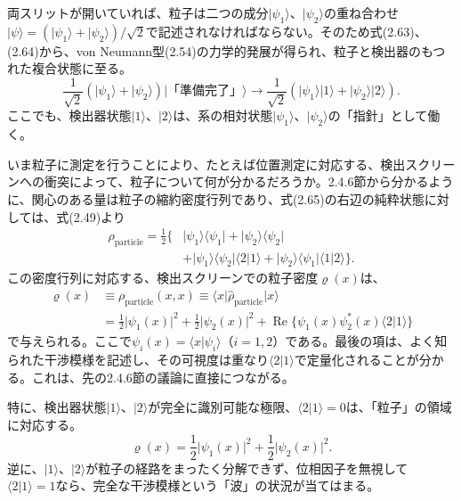 両スリットが開いていれば、粒子は二つの成分$\lvert\psi_1\rangle$、$\lvert\psi_2\rangle$の重ね合わせ$\lvert\psi\rangle=(\lvert\psi_1\rangle+\lvert\psi_2\rangle)/\sqrt2$で記述されなければならない。そのため式(2.63)、(2.64)から、von Neumann型(2.54)の力学的発展が得られ、粒子と検出器のもつれた複合状態に至る。
\begin{equation}\frac1{\sqrt2}(\lvert\psi_1\rangle+\lvert\psi_2\rangle)\lvert\text{「準備完了」}\rangle\longrightarrow\frac1{\sqrt2}(\lvert\psi_1\rangle\lvert1\rangle+\lvert\psi_2\rangle\lvert2\rangle).\tag{2.65}\end{equation}
ここでも、検出器状態$\lvert1\rangle$、$\lvert2\rangle$は、系の相対状態$\lvert\psi_1\rangle$、$\lvert\psi_2\rangle$の「指針」として働く。

いま粒子に測定を行うことにより、たとえば位置測定に対応する、検出スクリーンへの衝突によって、粒子について何が分かるだろうか。2.4.6節から分かるように、関心のある量は粒子の縮約密度行列であり、式(2.65)の右辺の純粋状態に対しては、式(2.49)より
\begin{equation}\begin{split}\hat\rho_{\mathrm{particle}}=\frac12\{&\lvert\psi_1\rangle\langle\psi_1\rvert+\lvert\psi_2\rangle\langle\psi_2\rvert\\&+\lvert\psi_1\rangle\langle\psi_2\rvert\langle2\vert1\rangle+\lvert\psi_2\rangle\langle\psi_1\rvert\langle1\vert2\rangle\}.\end{split}\tag{2.66}\end{equation}
この密度行列に対応する、検出スクリーンでの粒子密度$\varrho(x)$は、
\begin{equation}\begin{split}\varrho(x)&\equiv\rho_{\mathrm{particle}}(x,x)\equiv\langle x\rvert\hat\rho_{\mathrm{particle}}\lvert x\rangle\\&=\frac12\lvert\psi_1(x)\rvert^2+\frac12\lvert\psi_2(x)\rvert^2+\operatorname{Re}\{\psi_1(x)\psi_2^*(x)\langle2\vert1\rangle\}\end{split}\tag{2.67}\end{equation}
で与えられる。ここで$\psi_i(x)=\langle x\vert\psi_i\rangle$（$i=1,2$）である。最後の項は、よく知られた干渉模様を記述し、その可視度は重なり$\langle2\vert1\rangle$で定量化されることが分かる。これは、先の2.4.6節の議論に直接につながる。

特に、検出器状態$\lvert1\rangle$、$\lvert2\rangle$が完全に識別可能な極限、$\langle2\vert1\rangle=0$は、「粒子」の領域に対応する。
\begin{equation}\varrho(x)=\frac12\lvert\psi_1(x)\rvert^2+\frac12\lvert\psi_2(x)\rvert^2.\tag{2.68}\end{equation}
逆に、$\lvert1\rangle$、$\lvert2\rangle$が粒子の経路をまったく分解できず、位相因子を無視して$\langle2\vert1\rangle=1$なら、完全な干渉模様という「波」の状況が当てはまる。

